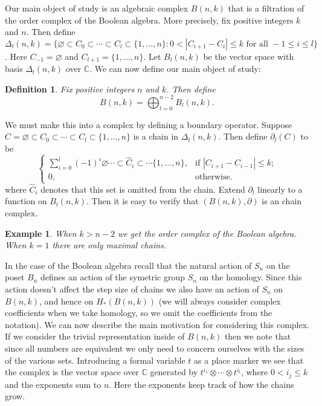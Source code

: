 \documentclass{elsart}
\newtheorem{definition}[theorem]{Definition}
\newtheorem{example}[theorem]{Example}
\newcommand{\C}{\mathbb{C}}
\newcommand{\full}{\{1, \ldots, n\}}
\begin{document}
  Our main object of study is an algebraic complex $B(n, k)$ that is a filtration of the order complex of the 
Boolean algebra. More precisely, fix positive integers $k$ and $n$. Then define 
  $\Delta_l(n, k) = \{\varnothing \subset C_0 \subset \cdots \subset C_l \subset \{1, \ldots, n\}
  \colon 0 < |C_{i+1} - C_i| \le k 
  \mbox{ for all } -1 \le i \le l \}$. Here $C_{-1} = \varnothing$ and $C_{l+1} = \full$. Let $B_l(n, k)$ be the vector 
   space with basis $\Delta_l(n, k)$ over $\C$.
  We can now define our main object of study: 
\begin{definition}\label{:B(n,k)} Fix positive integers $n$ and $k$. Then define
  \begin{equation}
    B(n, k) = \bigoplus_{l=0}^{n-2} B_l(n, k).
  \end{equation}
\end{definition}
We must make this into a complex by defining a boundary operator. Suppose $C = \varnothing \subset C_0 \subset  \cdots
\subset C_l \subset \{1, \ldots, n\}$ is a chain in $\Delta_l(n, k)$.
Then define $\partial_l(C)$ to be 
\begin{equation}\label{E:delta}
  \begin{cases}
     \sum_{i=0}^l (-1)^i \varnothing \cdots \subset {\hat C_i} \subset \cdots \full, 
         &\text{if $|C_{i+1} - C_{i-1}| \le k$;}\\
     0, &\text{otherwise.}
  \end{cases}
\end{equation} where ${\hat C_i}$ denotes that this set is omitted from the chain. 
Extend $\partial_l$ linearly to a function on $B_l(n, k)$. Then it is easy to verify that $(B(n, k), \partial)$
is an chain complex.  

\begin{example} When $k > n-2$ we get the order complex of the Boolean algebra. When $k=1$ there are only maximal chains.
\end{example}


In the case of the Boolean algebra recall that
the natural action of $S_n$ on the poset $B_n$ defines an action of the symetric group $S_n$ on the homology. Since this action doesn't 
affect the step size of chains we also have an action of $S_n$ on $B(n, k)$, and hence on $H_*(B(n, k))$ (we will always 
consider
complex coefficients when we take homology, so we omit the coefficients from the notation). We can now describe the
main motivation for considering this complex. If we consider the trivial representation inside of $B(n, k)$ then we
note that since all numbers are equivalent we only need to concern ourselves with the sizes of the various sets. 
Introducing a formal variable $t$ as a place marker we see that the complex is the vector space over $\C$ generated
by $t^{i_1}\otimes \cdots \otimes t^{i_l}$, where $0 <i_j \le k$ and the exponents sum to $n$.
 Here the exponents keep track of how the chains grow. 
\end{document}
